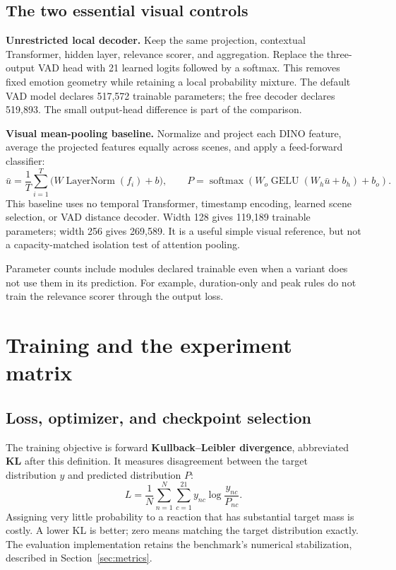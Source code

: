 \documentclass[11pt,a4paper]{article}
\newcommand{\softmax}{\operatorname{softmax}}
\newcommand{\LN}{\operatorname{LayerNorm}}
\newcommand{\GELU}{\operatorname{GELU}}
\begin{document}
\subsection{The two essential visual controls}
\textbf{Unrestricted local decoder.} Keep the same projection, contextual Transformer, hidden layer, relevance scorer, and aggregation. Replace the three-output VAD head with 21 learned logits followed by a softmax. This removes fixed emotion geometry while retaining a local probability mixture. The default VAD model declares 517,572 trainable parameters; the free decoder declares 519,893. The small output-head difference is part of the comparison.

\textbf{Visual mean-pooling baseline.} Normalize and project each DINO feature, average the projected features equally across scenes, and apply a feed-forward classifier:
\begin{equation}
\bar u=\frac{1}{T}\sum_{i=1}^{T}\bigl(W\LN(f_i)+b\bigr),\qquad
P=\softmax\!\left(W_o\GELU(W_h\bar u+b_h)+b_o\right).
\end{equation}
This baseline uses no temporal Transformer, timestamp encoding, learned scene selection, or VAD distance decoder. Width 128 gives 119,189 trainable parameters; width 256 gives 269,589. It is a useful simple visual reference, but not a capacity-matched isolation test of attention pooling.

Parameter counts include modules declared trainable even when a variant does not use them in its prediction. For example, duration-only and peak rules do not train the relevance scorer through the output loss.

\section{Training and the experiment matrix}
\subsection{Loss, optimizer, and checkpoint selection}
The training objective is forward \textbf{Kullback--Leibler divergence}, abbreviated \textbf{KL} after this definition. It measures disagreement between the target distribution $y$ and predicted distribution $P$:
\begin{equation}
L=\frac{1}{N}\sum_{n=1}^{N}\sum_{c=1}^{21}y_{nc}\log\frac{y_{nc}}{P_{nc}}.
\end{equation}
Assigning very little probability to a reaction that has substantial target mass is costly. A lower KL is better; zero means matching the target distribution exactly. The evaluation implementation retains the benchmark's numerical stabilization, described in Section~\ref{sec:metrics}.
\end{document}
